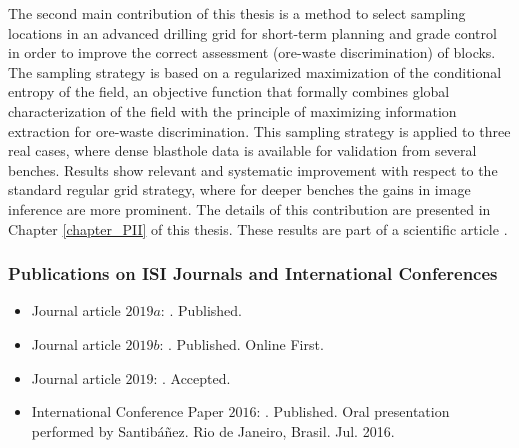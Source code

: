 The second main contribution of this thesis is a method to select sampling locations in an advanced drilling grid for short-term planning and grade control in order to improve the correct assessment (ore-waste discrimination) of blocks.  %
The sampling strategy is based on a regularized maximization of the conditional entropy of the field, an objective function that formally combines global characterization of the field with the principle of maximizing information extraction for ore-waste discrimination.
%
%
This sampling strategy is applied to three real cases, where dense blasthole data is available for validation from several benches. %
Results show relevant and systematic improvement with respect to the standard regular grid strategy, where for deeper benches the gains in image inference are more prominent. 
The details of this contribution are presented in Chapter \ref{chapter_PII} of this thesis. These results are part of a scientific article \citep{Santibanez2019_b}.

\subsubsection{Publications on ISI Journals and International Conferences}
\begin{itemize}
    \item Journal article $2019a$: . Published.
    \item Journal article $2019b$: . Published. Online First.
    \item Journal article $2019$: . Accepted.
    \item International Conference Paper $2016$: .  Published. Oral presentation performed by Santibáñez. {Rio de Janeiro, Brasil. Jul. 2016}.   
\end{itemize}

